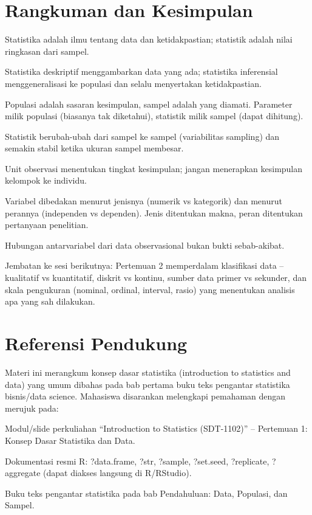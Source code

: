 \documentclass[
  indonesian,
  letterpaper,
]{book}
\begin{document}
\section{Rangkuman dan Kesimpulan}\label{rangkuman-dan-kesimpulan}

Statistika adalah ilmu tentang data dan ketidakpastian; statistik adalah
nilai ringkasan dari sampel.

Statistika deskriptif menggambarkan data yang ada; statistika
inferensial menggeneralisasi ke populasi dan selalu menyertakan
ketidakpastian.

Populasi adalah sasaran kesimpulan, sampel adalah yang diamati.
Parameter milik populasi (biasanya tak diketahui), statistik milik
sampel (dapat dihitung).

Statistik berubah-ubah dari sampel ke sampel (variabilitas sampling) dan
semakin stabil ketika ukuran sampel membesar.

Unit observasi menentukan tingkat kesimpulan; jangan menerapkan
kesimpulan kelompok ke individu.

Variabel dibedakan menurut jenisnya (numerik vs kategorik) dan menurut
perannya (independen vs dependen). Jenis ditentukan makna, peran
ditentukan pertanyaan penelitian.

Hubungan antarvariabel dari data observasional bukan bukti sebab-akibat.

Jembatan ke sesi berikutnya: Pertemuan 2 memperdalam klasifikasi data --
kualitatif vs kuantitatif, diskrit vs kontinu, sumber data primer vs
sekunder, dan skala pengukuran (nominal, ordinal, interval, rasio) yang
menentukan analisis apa yang sah dilakukan.

\section{Referensi Pendukung}\label{referensi-pendukung}

Materi ini merangkum konsep dasar statistika (introduction to statistics
and data) yang umum dibahas pada bab pertama buku teks pengantar
statistika bisnis/data science. Mahasiswa disarankan melengkapi
pemahaman dengan merujuk pada:

Modul/slide perkuliahan ``Introduction to Statistics (SDT-1102)'' --
Pertemuan 1: Konsep Dasar Statistika dan Data.

Dokumentasi resmi R: ?data.frame, ?str, ?sample, ?set.seed, ?replicate,
?aggregate (dapat diakses langsung di R/RStudio).

Buku teks pengantar statistika pada bab Pendahuluan: Data, Populasi, dan
Sampel.
\end{document}
